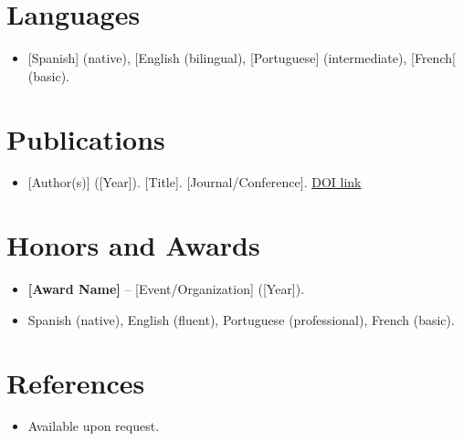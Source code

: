 \documentclass[11pt,a4paper,sans]{moderncv}
\begin{document}

\section{Languages}
\vspace{1pt}
\begin{itemize}

\item {[Spanish] (native), [English (bilingual), [Portuguese] (intermediate), [French[ (basic).}
\end{itemize}


\section{Publications}
\vspace{1pt}
\begin{itemize}
\item {[Author(s)] ([Year]). [Title]. [Journal/Conference]. \href{[DOI_URL]}{DOI link}}
\end{itemize}


\section{Honors and Awards}
\vspace{1pt}
\begin{itemize}
\item{\textbf{[Award Name]} -- [Event/Organization] ([Year]).}

\item Spanish (native), English (fluent), Portuguese (professional), French (basic).

\end{itemize}


\section{References}
\vspace{1pt}
\begin{itemize}
\item{Available upon request.}
\end{itemize}
\end{document}
